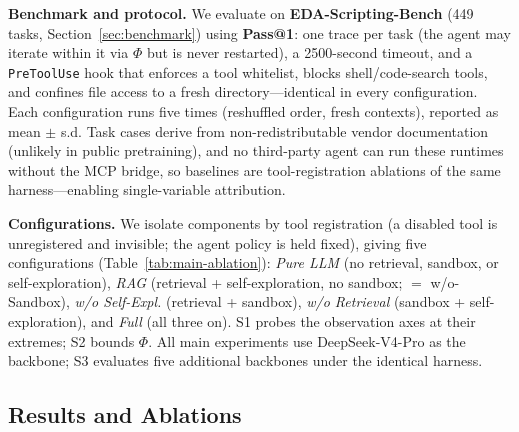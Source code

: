 \textbf{Benchmark and protocol.} We evaluate on \textbf{EDA-Scripting-Bench} (449 tasks, Section~\ref{sec:benchmark}) using \textbf{Pass@1}: one trace per task (the agent may iterate within it via $\Phi$ but is never restarted), a 2500-second timeout, and a \texttt{PreToolUse} hook that enforces a tool whitelist, blocks shell/code-search tools, and confines file access to a fresh directory---identical in every configuration. Each configuration runs five times (reshuffled order, fresh contexts), reported as mean $\pm$ s.d. Task cases derive from non-redistributable vendor documentation (unlikely in public pretraining), and no third-party agent can run these runtimes without the MCP bridge, so baselines are tool-registration ablations of the same harness---enabling single-variable attribution.

\textbf{Configurations.} We isolate components by tool registration (a disabled tool is unregistered and invisible; the agent policy is held fixed), giving five configurations (Table~\ref{tab:main-ablation}): \emph{Pure LLM} (no retrieval, sandbox, or self-exploration), \emph{RAG} (retrieval + self-exploration, no sandbox; $=$ w/o-Sandbox), \emph{w/o Self-Expl.} (retrieval + sandbox), \emph{w/o Retrieval} (sandbox + self-exploration), and \emph{Full} (all three on). S1 probes the observation axes at their extremes; S2 bounds $\Phi$. All main experiments use DeepSeek-V4-Pro as the backbone; S3 evaluates five additional backbones under the identical harness.

\subsection{Results and Ablations}
\label{sec:exp-results}

